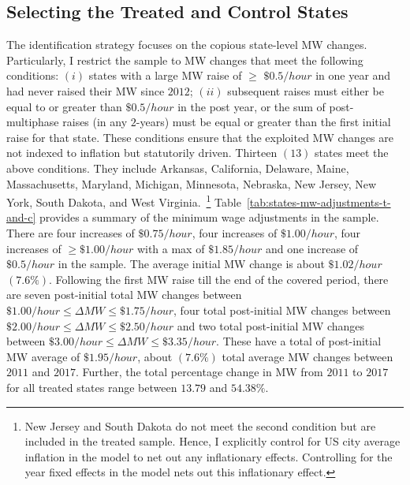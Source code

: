 \documentclass[12pt, english]{article}
\begin{document}
    \subsection{Selecting the Treated and Control States}\label{subsec:selecting-the-treated-and-control-states}
    The identification strategy focuses on the copious state-level MW changes. Particularly, I restrict the sample to MW changes that meet the following conditions: $(i)$ states with a large MW raise of $\geq$ $\$0.5/hour$ in one year and had never raised their MW since $2012$; $(ii)$ subsequent raises must either be equal to or greater than $\$0.5/hour$ in the post year, or the sum of post-multiphase raises (in any $2$-years) must be equal or greater than the first initial raise for that state. These conditions ensure that the exploited MW changes are not indexed to inflation but statutorily driven. Thirteen $(13)$ states meet the above conditions. They include Arkansas, California, Delaware, Maine, Massachusetts, Maryland, Michigan, Minnesota, Nebraska, New Jersey, New York, South Dakota, and West Virginia.~\footnote{\tiny New Jersey and South Dakota do not meet the second condition but are included in the treated sample. Hence, I explicitly control for US city average inflation in the model to net out any inflationary effects. Controlling for the year fixed effects in the model nets out this inflationary effect.} Table~\ref{tab:states-mw-adjustments-t-and-c} provides a summary of the minimum wage adjustments in the sample. There are four increases of $\$0.75/hour$, four increases of $\$1.00/hour$, four increases of $\geq \$1.00/hour$ with a max of $\$1.85/hour$ and one increase of $\$0.5/hour$ in the sample. The average initial MW change is about $\$1.02/hour$ $(7.6\%)$. Following the first MW raise till the end of the covered period, there are seven post-initial total MW changes between $\$1.00/hour \leq \Delta MW \leq \$1.75/hour$, four total post-initial MW changes between $\$2.00/hour \leq \Delta MW \leq \$2.50/hour$ and two total post-initial MW changes between $\$3.00/hour \leq \Delta MW \leq \$3.35/hour$. These have a total of post-initial MW average of $\$1.95/hour$, about $(7.6\%)$ total average MW changes between $2011$ and $2017$. Further, the total percentage change in MW from $2011$ to $2017$ for all treated states range between $13.79$ and $54.38\%$.
    
\end{document}
